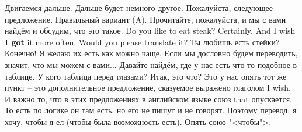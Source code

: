 \documentclass[main.tex]{subfiles}
\begin{document}
Двигаемся дальше.
Дальше будет немного другое.
Пожалуйста, следующее предложение.
Правильный вариант (A).
Прочитайте, пожалуйста, и мы с вами найдём и обсудим, что это такое.
Do you like to eat steak?
Certainly.
And I wish \textbf{I got} it more often.
Would you please translate it?
Ты любишь есть стейки?
Конечно! Я желаю их есть как можно чаще.
Если мы дословно будем переводить, значит, что мы можем с вами...
Давайте найдём, где у нас есть что-то подобное в таблице.
У кого таблица перед глазами?
Итак, это что?
Это у нас опять тот же пункт -- это дополнительное предложение, сказуемое выражено глаголом I wish.
И важно то, что в этих предложениях в английском языке союз that опускается.
То есть по логике он там есть, но его не пишут и не говорят.
Поэтому перевод: я хочу, чтобы я ел (чтобы была возможность есть).
Опять союз "<чтобы">.
\end{document}
